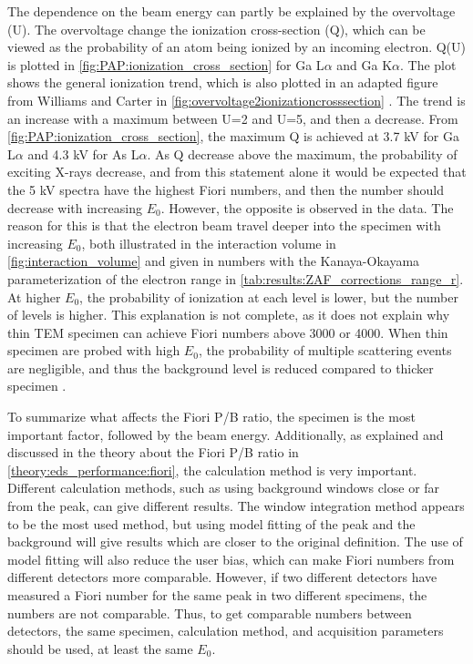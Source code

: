 The dependence on the beam energy can partly be explained by the overvoltage (U).
The overvoltage change the ionization cross-section (Q), which can be viewed as the probability of an atom being ionized by an incoming electron.
Q(U) is plotted in \cref{fig:PAP:ionization_cross_section} for Ga L$\alpha$ and Ga K$\alpha$.
The plot shows the general ionization trend, which is also plotted in an adapted figure from Williams and Carter in \cref{fig:overvoltage2ionizationcrosssection} \cite{williams_carter_tem_2009}.
The trend is an increase with a maximum between U=2 and U=5, and then a decrease.
From \cref{fig:PAP:ionization_cross_section}, the maximum Q is achieved at 3.7 kV for Ga L$\alpha$ and 4.3 kV for As L$\alpha$.
As Q decrease above the maximum, the probability of exciting X-rays decrease, and from this statement alone it would be expected that the 5 kV spectra have the highest Fiori numbers, and then the number should decrease with increasing $E_0$.
However, the opposite is observed in the data.
The reason for this is that the electron beam travel deeper into the specimen with increasing $E_0$, both illustrated in the interaction volume in \cref{fig:interaction_volume} and given in numbers with the Kanaya-Okayama parameterization of the electron range in \cref{tab:results:ZAF_corrections_range_r}.
At higher $E_0$, the probability of ionization at each level is lower, but the number of levels is higher.
This explanation is not complete, as it does not explain why thin TEM specimen can achieve Fiori numbers above 3000 or 4000.
When thin specimen are probed with high $E_0$, the probability of multiple scattering events are negligible, and thus the background level is reduced compared to thicker specimen \cite{liao2006practical}.


To summarize what affects the Fiori P/B ratio, the specimen is the most important factor, followed by the beam energy.
Additionally, as explained and discussed in the theory about the Fiori P/B ratio in \cref{theory:eds_performance:fiori}, the calculation method is very important.
Different calculation methods, such as using background windows close or far from the peak, can give different results.
The window integration method appears to be the most used method, but using model fitting of the peak and the background will give results which are closer to the original definition.
The use of model fitting will also reduce the user bias, which can make Fiori numbers from different detectors more comparable.
However, if two different detectors have measured a Fiori number for the same peak in two different specimens, the numbers are not comparable.
Thus, to get comparable numbers between detectors, the same specimen, calculation method, and acquisition parameters should be used, at least the same $E_0$.



